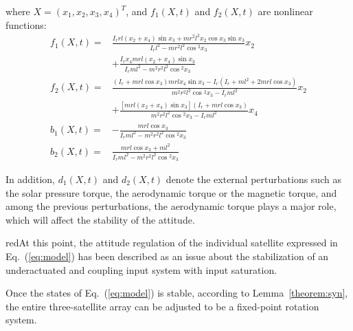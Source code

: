 where $X = (x_1,x_2,x_3,x_4)^T$, and $f_1(X,t)$ and $f_2(X,t)$ are nonlinear functions:
\begin{align*}
f_1(X,t) =& \frac{I_rrl(x_2+x_4)\sin x_3+mr^2l^2x_2\cos x_3\sin x_3}{I_rl^2-mr^2l^2\cos{^2x_3}}x_2\\
          &+\frac{I_rx_4 mrl(x_2+x_4)\sin x_3 }{I_rml^2-m^2r^2l^2\cos{^2x_3}}\\
f_2(X,t) =& \frac{(I_r+mrl\cos x_3)mrlx_4\sin x_3-I_r(I_r+ml^2+2mrl\cos x_3)}{m^2r^2l^2\cos{^2x_3}-I_rml^2}x_2\\
          &+\frac{[mrl(x_2+x_4)\sin x_3](I_r+mrl\cos x_3)}{m^2r^2l^2\cos{^2x_3}-I_rml^2}x_4\\
b_1(X,t) =&-\frac{mrl\cos x_3}{I_rml^2-m^2r^2l^2\cos{^2x_3}}\\
b_2(X,t) =&\frac{mrl\cos x_3+ml^2}{I_rml^2-m^2r^2l^2\cos{^2x_3}}
\end{align*}\par
In addition, $d_1(X,t)$ and $d_2(X,t)$ denote the external perturbations such as the solar pressure torque, the aerodynamic torque or the magnetic torque, and among the previous perturbations, the aerodynamic torque plays a major role, which will affect the stability of the attitude.\par
\begin{color}{red}At this point, the attitude regulation of the individual satellite expressed in Eq.~(\ref{eq:model}) has been described as an issue about the stabilization of an underactuated and coupling input system with input saturation.\end{color} Once the states of Eq.~(\ref{eq:model}) is stable, according to Lemma~\ref{theorem:syn}, the entire three-satellite array can be adjusted to be a fixed-point rotation system.
